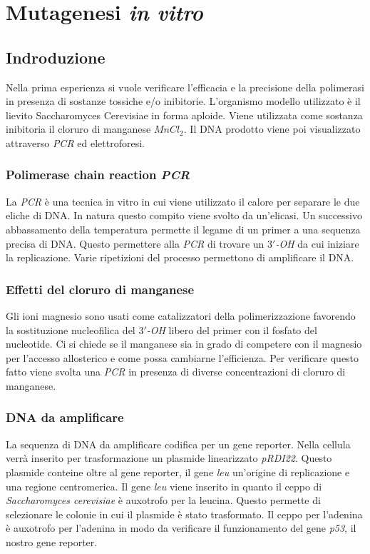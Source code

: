 \section*{Mutagenesi \emph{in vitro}}

	\subsection*{Indroduzione}
        Nella prima esperienza si vuole verificare l'efficacia e la precisione della polimerasi in presenza di sostanze tossiche e/o inibitorie.
        L'organismo modello utilizzato è il lievito Saccharomyces Cerevisiae in forma aploide.
	Viene utilizzata come sostanza inibitoria il cloruro di manganese \emph{$MnCl_2$}.
	Il DNA prodotto viene poi visualizzato attraverso \emph{PCR} ed elettroforesi.
        
		\subsubsection*{Polimerase chain reaction \emph{PCR}}
		La \emph{PCR} \`e una tecnica in vitro in cui viene utilizzato il calore per separare le due eliche di DNA.
		In natura questo compito viene svolto da un'elicasi.
       		Un successivo abbassamento della temperatura permette il legame di un primer a una sequenza precisa di DNA.
		Questo permettere alla \emph{PCR} di trovare un \emph{$3'$-OH} da cui iniziare la replicazione.
		Varie ripetizioni del processo permettono di amplificare il DNA.

		\subsubsection*{Effetti del cloruro di manganese}
		Gli ioni magnesio sono usati come catalizzatori della polimerizzazione favorendo la sostituzione nucleofilica del \emph{$3'$-OH} libero del primer con il fosfato del nucleotide.
		Ci si chiede se il manganese sia in grado di competere con il magnesio per l'accesso allosterico e come possa cambiarne l'efficienza.
		Per verificare questo fatto viene svolta una \emph{PCR} in presenza di diverse concentrazioni di cloruro di manganese.

		\subsubsection*{DNA da amplificare}
        	La sequenza di DNA da amplificare codifica per un gene reporter.
		Nella cellula verrà inserito per trasformazione un plasmide linearizzato \emph{pRDI22}.
		Questo plasmide conteine oltre al gene reporter, il gene \emph{leu} un'origine di replicazione e una regione centromerica.
		Il gene \emph{leu} viene inserito in quanto il ceppo di \emph{Saccharomyces cerevisiae} \`e auxotrofo per la leucina.
		Questo permette di selezionare le colonie in cui il plasmide \`e stato trasformato.
		Il ceppo per l'adenina \`e auxotrofo per l'adenina in modo da verificare il funzionamento del gene \emph{p53}, il nostro gene reporter.

